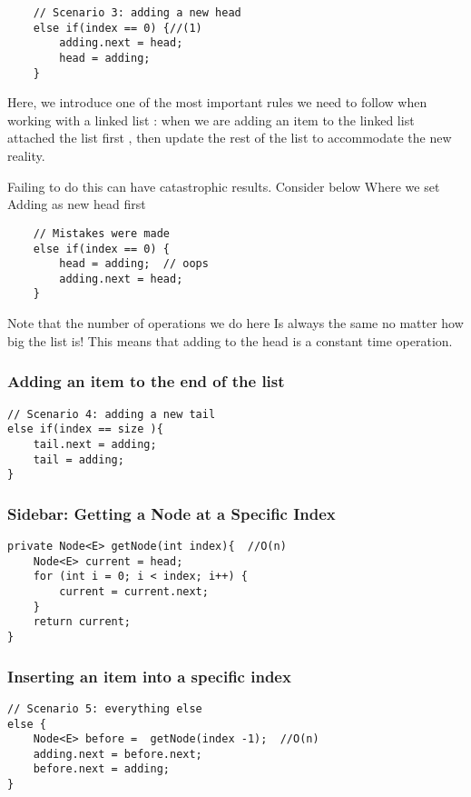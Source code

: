 \begin{verbatim}
	// Scenario 3: adding a new head
	else if(index == 0) {//(1)
		adding.next = head;
		head = adding;
	}
\end{verbatim}



Here, we introduce one of the most important rules we need to follow when working with a linked list : when we are adding an item to the linked list attached the list first , then update the rest of the list to accommodate the new reality.

Failing to do this can have catastrophic results.  Consider below Where we set Adding as new head first 



\begin{verbatim}
	// Mistakes were made
	else if(index == 0) {
		head = adding;  // oops
		adding.next = head;
	}
\end{verbatim}




Note that the number of operations we do here Is always the same no matter how big the list is!  This means that adding to the head is a constant time operation.

\subsubsection{Adding an item to the end of the list}
\begin{verbatim}
// Scenario 4: adding a new tail
else if(index == size ){
	tail.next = adding;
	tail = adding;
}
\end{verbatim}


\subsubsection{Sidebar: Getting a Node at a Specific Index}
\begin{verbatim}
private Node<E> getNode(int index){  //O(n)
	Node<E> current = head;
	for (int i = 0; i < index; i++) {
		current = current.next;
	}
	return current;
}	
\end{verbatim}



\subsubsection{Inserting an item into a specific index}

\begin{verbatim}
// Scenario 5: everything else
else {
	Node<E> before =  getNode(index -1);  //O(n)
	adding.next = before.next;
	before.next = adding;
}	
\end{verbatim}

